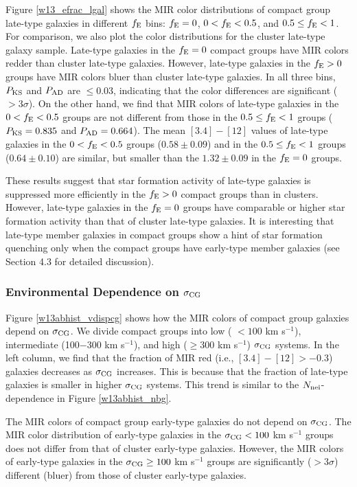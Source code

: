 \documentclass[12pt,preprint,apj]{emulateapj}
\newcommand{\efrac}{f_{\rm E}}
\newcommand{\nbg}{N_{\rm nei}}
\begin{document}
Figure \ref{w13_efrac_lgal} shows the MIR color distributions
of compact group late-type galaxies in different $\efrac$ bins:
$\efrac=0$, $0<\efrac<0.5$, and $0.5\leq\efrac<1$. 
For comparison, we also plot the color distributions for the cluster late-type galaxy sample.
Late-type galaxies in the $\efrac=0$ compact groups have  
MIR colors redder than cluster late-type galaxies. 
However, late-type galaxies in the $\efrac>0$ groups have MIR colors bluer 
than cluster late-type galaxies.
In all three bins, $P_{\rm KS}$ and $P_{\rm AD}$ are $\leq0.03$,
indicating that the color differences are significant ($>3\sigma$). 
On the other hand, we find that 
MIR colors of late-type galaxies in the $0<\efrac<0.5$ groups are not different from 
those in the $0.5\leq\efrac<1$ groups ($P_{\rm KS}=0.835$ and $P_{\rm AD}=0.664$). 
The mean $[3.4]-[12]$ values of late-type galaxies in 
the $0<\efrac<0.5$ groups ($0.58\pm0.09$) and in the $0.5\leq\efrac<1$ groups
($0.64\pm0.10$) are similar, but smaller than the $1.32\pm0.09$ 
in the $\efrac=0$ groups.




These results suggest that star formation activity of late-type galaxies 
is suppressed more efficiently in the $\efrac>0$ compact groups than in clusters. 
However, late-type galaxies in the $\efrac=0$ groups have comparable or higher 
star formation activity than that of cluster late-type galaxies.
It is interesting that late-type member galaxies in compact groups show 
a hint of star formation quenching only
when the compact groups have early-type member galaxies (see Section 4.3
for detailed discussion).

\subsubsection{Environmental Dependence on $\sigma_{\rm CG}$}

Figure \ref{w13abhist_vdispcg} shows how the MIR colors  
of compact group galaxies depend on $\sigma_{\rm CG}$. 
We divide compact groups into low 
( $< 100$ km s$^{-1}$), intermediate (100$-$300 km s$^{-1}$), 
and high ($\geq300$ km s$^{-1}$) $\sigma_{\rm CG}$ systems.
In the left column, we find that the fraction of MIR red (i.e., $[3.4]-[12]>-0.3$) 
galaxies decreases as $\sigma_{\rm CG}$ increases. 
This is because that the fraction of late-type galaxies is smaller in 
higher $\sigma_{\rm CG}$ systems.
This trend is similar to the $\nbg$-dependence in Figure \ref{w13abhist_nbg}.

The MIR colors of compact group early-type galaxies do not depend on 
$\sigma_{\rm CG}$.
The MIR color distribution of early-type galaxies in the $\sigma_{\rm CG}<100$
km s$^{-1}$ groups does not differ from that of cluster early-type galaxies. 
However, the MIR colors of early-type galaxies in  
the $\sigma_{\rm CG}\geq100$ km s$^{-1}$ groups are significantly ($>3\sigma$) 
different (bluer) from those of cluster early-type galaxies.
 
\end{document}
